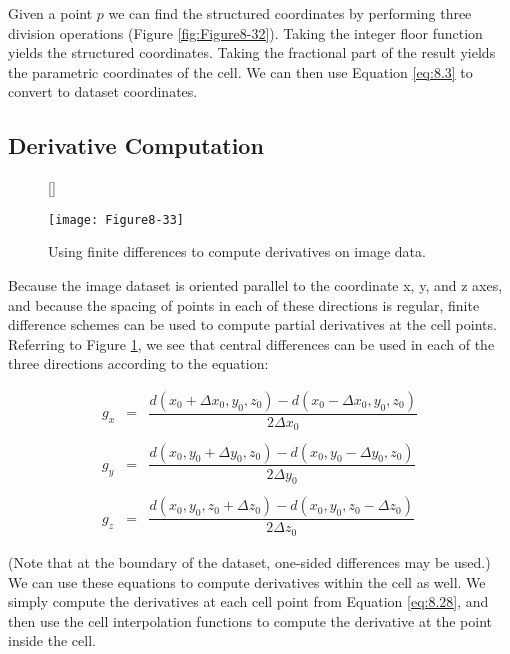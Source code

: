 Given a point $p$ we can find the structured coordinates by performing three division operations (Figure \ref{fig:Figure8-32}). Taking the integer floor function yields the structured coordinates. Taking the fractional part of the result yields the parametric coordinates of the cell. We can then use Equation \ref{eq:8.3} to convert to dataset coordinates.

\subsection{Derivative Computation}

\begin{figure}[!htb]
	[\FBwidth]
	{\caption{Using finite differences to compute derivatives on image data.}\label{fig:Figure8-33}}
	{\texttt{[image: Figure8-33]}}
\end{figure}


Because the image dataset is oriented parallel to the coordinate x, y, and z axes, and because the spacing of points in each of these directions is regular, finite difference schemes can be used to compute partial derivatives at the cell points. Referring to Figure \ref{fig:Figure8-33}, we see that central differences can be used in each of the three directions according to the equation:

\begin{equation}\label{eq:8.28}
\begin{array}{lll}
g_x &=& \dfrac{d(x_0 + \Delta x_0, y_0, z_0) - d(x_0 - \Delta x_0, y_0, z_0)}{2 \Delta x_0} \\ \\
g_y &=& \dfrac{d(x_0, y_0 + \Delta y_0, z_0) - d(x_0, y_0 - \Delta y_0, z_0)}{2 \Delta y_0} \\ \\
g_z &=& \dfrac{d(x_0, y_0, z_0 + \Delta z_0) - d(x_0, y_0, z_0 - \Delta z_0)}{2 \Delta z_0}
\end{array}
\end{equation}

(Note that at the boundary of the dataset, one-sided differences may be used.) We can use these equations to compute derivatives within the cell as well. We simply compute the derivatives at each cell point from Equation \ref{eq:8.28}, and then use the cell interpolation functions to compute the derivative at the point inside the cell.

